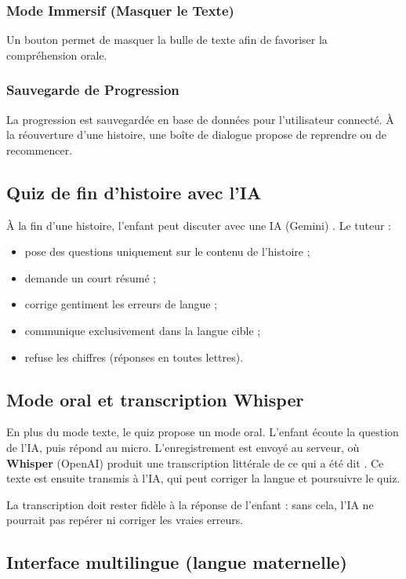 \documentclass[12pt,twoside,letterpaper]{article}
\begin{document}
\subsubsection{Mode Immersif (Masquer le Texte)}
Un bouton permet de masquer la bulle de texte afin de favoriser la compr\'ehension orale.

\subsubsection{Sauvegarde de Progression}
La progression est sauvegard\'ee en base de donn\'ees pour l'utilisateur connect\'e.
\`A la r\'eouverture d'une histoire, une bo\^ite de dialogue propose de reprendre ou de recommencer.

\subsection{Quiz de fin d'histoire avec l'IA}

\`A la fin d'une histoire, l'enfant peut discuter avec une IA (Gemini) \cite{gemini}.
Le tuteur :
\begin{itemize}[leftmargin=*]
  \item pose des questions uniquement sur le contenu de l'histoire ;
  \item demande un court r\'esum\'e ;
  \item corrige gentiment les erreurs de langue ;
  \item communique exclusivement dans la langue cible ;
  \item refuse les chiffres (r\'eponses en toutes lettres).
\end{itemize}

\subsection{Mode oral et transcription Whisper}

En plus du mode texte, le quiz propose un mode oral.
L'enfant \'ecoute la question de l'IA, puis r\'epond au micro.
L'enregistrement est envoy\'e au serveur, o\`u \textbf{Whisper} (OpenAI)
produit une transcription litt\'erale de ce qui a \'et\'e dit \cite{whisper2022}.
Ce texte est ensuite transmis \`a l'IA, qui peut corriger la langue
et poursuivre le quiz.

La transcription doit rester fid\`ele \`a la r\'eponse de l'enfant :
sans cela, l'IA ne pourrait pas rep\'erer ni corriger les vraies erreurs.

\subsection{Interface multilingue (langue maternelle)}
\end{document}
